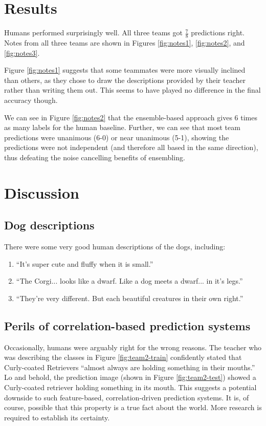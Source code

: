 \documentclass[sigplan,10pt]{acmart}
\begin{document}
\section{Results}

Humans performed surprisingly well. All three teams got $\frac{7}{8}$ predictions right. Notes from all three teams are shown in Figures \ref{fig:notes1}, \ref{fig:notes2}, and \ref{fig:notes3}. 

Figure \ref{fig:notes1} suggests that some teammates were more visually inclined than others, as they chose to draw the descriptions provided by their teacher rather than writing them out. This seems to have played no difference in the final accuracy though.

We can see in Figure \ref{fig:notes2} that the ensemble-based approach gives 6 times as many labels for the human baseline. 
Further, we can see that most team predictions were unanimous (6-0) or near unanimous (5-1), showing the predictions were not independent (and therefore all based in the same direction), thus defeating the noise cancelling benefits of ensembling.

\section{Discussion}
\subsection{Dog descriptions}
There were some very good human descriptions of the dogs, including:
\begin{enumerate}
    \item ``It's super cute and fluffy when it is small.''
    \item ``The Corgi... looks like a dwarf. Like a dog meets a dwarf... in it's legs.''
    \item ``They're very different. But each beautiful creatures in their own right.''
\end{enumerate}


\subsection{Perils of correlation-based prediction systems}
Occasionally, humans were arguably right for the wrong reasons. The teacher who was describing the classes in Figure \ref{fig:team2-train} confidently stated that Curly-coated Retrievers ``almost always are holding something in their mouths.'' Lo and behold, the prediction image (shown in Figure \ref{fig:team2-test}) showed a Curly-coated retriever holding something in its mouth. This suggests a potential downside to such feature-based, correlation-driven prediction systems. It is, of course, possible that this property is a true fact about the world. More research is required to establish its certainty.
\end{document}

